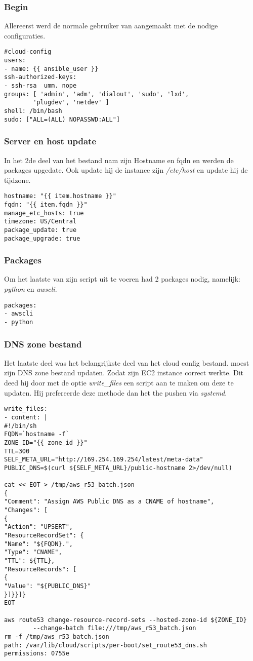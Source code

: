 \newpage
\subsubsection{Begin}
Allereerst werd de normale gebruiker van \autocite{scottharney} aangemaakt met de nodige configuraties.
\begin{lstlisting}
#cloud-config
users:
- name: {{ ansible_user }}
ssh-authorized-keys:
- ssh-rsa  umm. nope
groups: [ 'admin', 'adm', 'dialout', 'sudo', 'lxd', 
		'plugdev', 'netdev' ]
shell: /bin/bash
sudo: ["ALL=(ALL) NOPASSWD:ALL"]
\end{lstlisting} 

\subsubsection{Server en host update}
In het 2de deel van het bestand nam \autocite{scottharney} zijn Hostname en fqdn en werden de packages upgedate. Ook update hij de instance zijn \textit{/etc/host} en update hij de tijdzone.
\begin{lstlisting}
hostname: "{{ item.hostname }}"
fqdn: "{{ item.fqdn }}"
manage_etc_hosts: true
timezone: US/Central
package_update: true
package_upgrade: true
\end{lstlisting} 

\subsubsection{Packages}
Om het laatste van zijn script uit te voeren had \autocite{scottharney} 2 packages nodig, namelijk: \textit{python} en \textit{awscli}. 
\begin{lstlisting}
packages:
- awscli
- python
\end{lstlisting}

\newpage
\subsubsection{DNS zone bestand}
Het laatste deel was het belangrijkste deel van het cloud config bestand. \autocite{scottharney} moest zijn DNS zone bestand updaten. Zodat zijn EC2 instance correct werkte. Dit deed hij door met de optie \textit{write\_files} een script aan te maken om deze te updaten. Hij prefereerde deze methode dan het the pushen via \textit{systemd}.
\begin{lstlisting}
write_files:
- content: |
#!/bin/sh
FQDN=`hostname -f`
ZONE_ID="{{ zone_id }}"
TTL=300
SELF_META_URL="http://169.254.169.254/latest/meta-data"
PUBLIC_DNS=$(curl ${SELF_META_URL}/public-hostname 2>/dev/null)

cat << EOT > /tmp/aws_r53_batch.json
{
"Comment": "Assign AWS Public DNS as a CNAME of hostname",
"Changes": [
{
"Action": "UPSERT",
"ResourceRecordSet": {
"Name": "${FQDN}.",
"Type": "CNAME",
"TTL": ${TTL},
"ResourceRecords": [
{
"Value": "${PUBLIC_DNS}"
}]}}]}
EOT

aws route53 change-resource-record-sets --hosted-zone-id ${ZONE_ID} 
		--change-batch file:///tmp/aws_r53_batch.json
rm -f /tmp/aws_r53_batch.json
path: /var/lib/cloud/scripts/per-boot/set_route53_dns.sh
permissions: 0755e
\end{lstlisting}
\newpage
